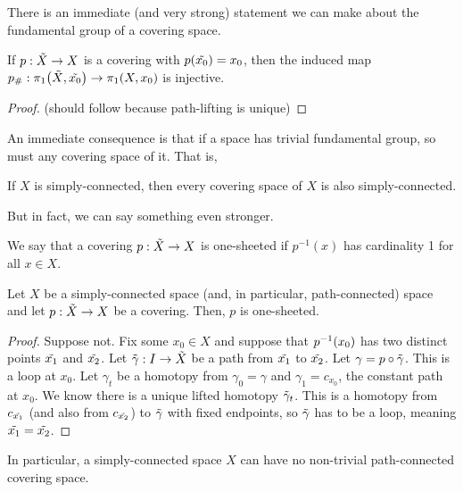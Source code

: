 There is an immediate (and very strong) statement we can make about the fundamental group of a covering space.

\begin{boxtheorem}
    If $p : \Tilde{X} \to X$ is a covering with $p\!\left( \Tilde{x_0} \right) = x_0$, then the induced map $p_{\#} : \pi_1\!\left( \Tilde{X}, \Tilde{x_0} \right) \to \pi_1\!\left( X, x_0 \right)$ is injective.
\end{boxtheorem}
\begin{proof}
    \sorry (should follow because path-lifting is unique)
\end{proof}

An immediate consequence is that if a space has trivial fundamental group, so must any covering space of it. That is,

\begin{boxcorollary}
    If $X$ is simply-connected, then every covering space of $X$ is also simply-connected.
\end{boxcorollary}

But in fact, we can say something even stronger.

\begin{boxdefinition}
    We say that a covering $p:\Tilde{X}\rightarrow X$ is one-sheeted if $p^{-1}(x)$ has cardinality 1 for all $x\in X$.%
\end{boxdefinition}

\begin{boxproposition}
    Let $X$ be a simply-connected space (and, in particular, path-connected) space and let $p : \Tilde{X} \to X$ be a covering. Then, $p$ is one-sheeted.
\end{boxproposition}
\begin{proof}
    Suppose not. Fix some $x_0 \in X$ and suppose that $p^{-1}\!\left( x_0 \right)$ has two distinct points $\Tilde{x_1}$ and $\Tilde{x_2}$. Let $\Tilde{\gamma} : I \to \Tilde{X}$ be a path from $\Tilde{x_1}$ to $\Tilde{x_2}$. Let $\gamma = p \circ \Tilde{\gamma}$. This is a loop at $x_0$. Let $\gamma_t$ be a homotopy from $\gamma_0 = \gamma$ and $\gamma_1 = c_{x_0}$, the constant path at $x_0$. We know there is a unique lifted homotopy $\Tilde{\gamma}_t$. This is a homotopy from $c_{\Tilde{x_1}}$ (and also from $c_{\Tilde{x_2}}$) to $\Tilde{\gamma}$ with fixed endpoints, so $\Tilde{\gamma}$ has to be a loop, meaning $\Tilde{x_1} = \Tilde{x_2}$.
\end{proof}

In particular, a simply-connected space $X$ can have no non-trivial path-connected covering space. 

